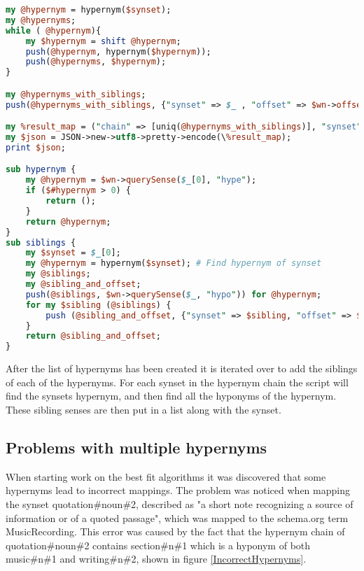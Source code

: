 \begin{lstlisting}[float=t, language=perl, label=HypernymChainCode, caption={Excerpt from the hypernym chain perl script}]
my @hypernym = hypernym($synset);
my @hypernyms;
while ( @hypernym){
	my $hypernym = shift @hypernym;
	push(@hypernym, hypernym($hypernym));
	push(@hypernyms, $hypernym);
}

my @hypernyms_with_siblings;
push(@hypernyms_with_siblings, {"synset" => $_ , "offset" => $wn->offset($_) ,"siblings" => [siblings($_)]}) for @hypernyms;

my %result_map = ("chain" => [uniq(@hypernyms_with_siblings)], "synset" => $synset, "offset"=> $wn->offset($synset), "siblings" => [siblings($synset)]);
my $json = JSON->new->utf8->pretty->encode(\%result_map);
print $json;

sub hypernym {
	my @hypernym = $wn->querySense($_[0], "hype");
	if ($#hypernym > 0) {
		return ();
	}
	return @hypernym;
}
sub siblings {
	my $synset = $_[0];
	my @hypernym = hypernym($synset); # Find hypernym of synset
	my @siblings;
	my @sibling_and_offset;
	push(@siblings, $wn->querySense($_, "hypo")) for @hypernym;
	for my $sibling (@siblings) {
		push (@sibling_and_offset, {"synset" => $sibling, "offset" => $wn->offset($sibling)});
	}
	return @sibling_and_offset;
}
\end{lstlisting}


After the list of hypernyms has been created it is iterated over to add the siblings of each of the hypernyms.
For each synset in the hypernym chain the script will find the synsets hypernym,
and then find all the hyponyms of the hypernym.
These sibling senses are then put in a list along with the synset.

\subsection{Problems with multiple hypernyms}
When starting work on the best fit algorithms it was discovered that some hypernyms lead to incorrect mappings.
The problem was noticed when mapping the synset quotation\#noun\#2,
described as "a short note recognizing a source of information or of a quoted passage",
which was mapped to the schema.org term MusicRecording.
This error was caused by the fact that the hypernym chain of quotation\#noun\#2 contains
section\#n\#1 which is a hyponym of both music\#n\#1 and writing\#n\#2, shown in figure \ref{IncorrectHypernyms}.


